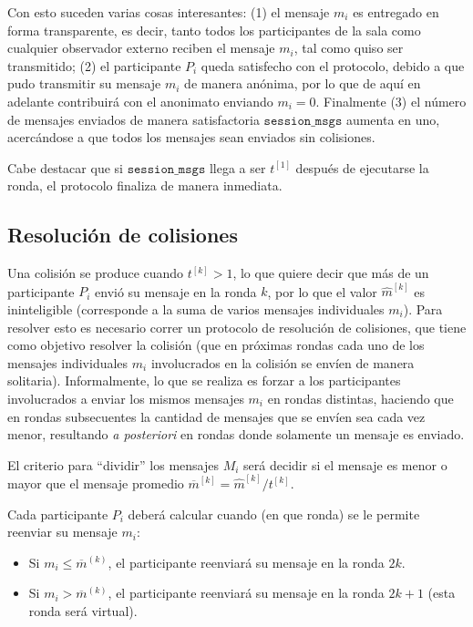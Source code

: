 Con esto suceden varias cosas interesantes: (1) el mensaje $m_i$ es entregado 
en forma transparente, es decir, tanto todos los participantes de la sala como 
cualquier observador externo reciben el mensaje $m_i$, tal como quiso ser 
transmitido; (2) el participante $P_i$ queda satisfecho con el protocolo, 
debido a que pudo transmitir su mensaje $m_i$ de manera anónima, por lo que de 
aquí en adelante contribuirá con el anonimato enviando $m_i = 0$. 
Finalmente (3) el número de mensajes enviados de manera satisfactoria 
$\mathtt{session\_msgs}$ aumenta en uno, acercándose a que todos los mensajes 
sean enviados sin colisiones.

Cabe destacar que si $\mathtt{session\_msgs}$ llega a ser $t^{[1]}$ después de 
ejecutarse la ronda, el protocolo finaliza de manera inmediata.

\subsection{Resolución de colisiones}

Una colisión se produce cuando $t^{[k]} > 1$, lo que quiere decir que más de un
participante $P_i$ envió su mensaje en la ronda $k$, por lo que el valor 
$\hat{m}^{[k]}$ es ininteligible (corresponde a la suma de varios mensajes 
individuales $m_i$). Para resolver esto es necesario correr un protocolo de 
resolución de colisiones, que tiene como objetivo resolver la colisión (que en 
próximas rondas cada uno de los mensajes individuales $m_i$ involucrados en la 
colisión se envíen de manera solitaria). Informalmente, lo que se realiza 
es forzar a los participantes involucrados a enviar los mismos mensajes $m_i$ 
en rondas distintas, haciendo que en rondas subsecuentes la cantidad de 
mensajes que se envíen sea cada vez menor, resultando \emph{a posteriori} en 
rondas donde solamente un mensaje es enviado.

El criterio para ``dividir'' los mensajes $M_i$ será decidir si el mensaje es 
menor o mayor que el mensaje promedio 
$\overline{m}^{[k]} = \hat{m}^{[k]} / t^{[k]}$.

Cada participante $P_i$ deberá calcular cuando (en que ronda) se le permite 
reenviar su mensaje $m_i$:
\begin{itemize}
    \item Si $m_i \leq \overline{m}^{(k)}$, el participante reenviará su 
    mensaje en la ronda $2k$.
    \item Si $m_i > \overline{m}^{(k)}$, el participante reenviará su mensaje 
    en la ronda $2k + 1$ (esta ronda será virtual).
\end{itemize}

